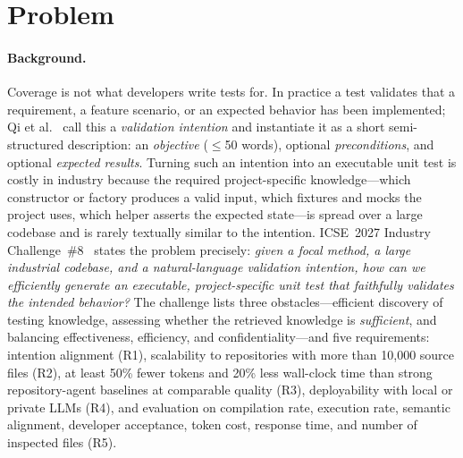 \documentclass[sigconf,nonacm]{acmart}
\begin{document}
\maketitle

\section{Problem}
\label{sec:problem}

\paragraph{Background.}
Coverage is not what developers write tests for. In practice a test validates that a requirement, a feature scenario, or an expected behavior has been implemented; Qi et al.~\cite{qi2025intentiontest} call this a \emph{validation intention} and instantiate it as a short semi-structured description: an \emph{objective} ($\le$50 words), optional \emph{preconditions}, and optional \emph{expected results}. Turning such an intention into an executable unit test is costly in industry because the required project-specific knowledge---which constructor or factory produces a valid input, which fixtures and mocks the project uses, which helper asserts the expected state---is spread over a large codebase and is rarely textually similar to the intention. ICSE~2027 Industry Challenge~\#8~\cite{icse27challenge8} states the problem precisely: \emph{given a focal method, a large industrial codebase, and a natural-language validation intention, how can we efficiently generate an executable, project-specific unit test that faithfully validates the intended behavior?} The challenge lists three obstacles---efficient discovery of testing knowledge, assessing whether the retrieved knowledge is \emph{sufficient}, and balancing effectiveness, efficiency, and confidentiality---and five requirements: intention alignment (R1), scalability to repositories with more than 10{,}000 source files (R2), at least 50\% fewer tokens and 20\% less wall-clock time than strong repository-agent baselines at comparable quality (R3), deployability with local or private LLMs (R4), and evaluation on compilation rate, execution rate, semantic alignment, developer acceptance, token cost, response time, and number of inspected files (R5).
\end{document}
